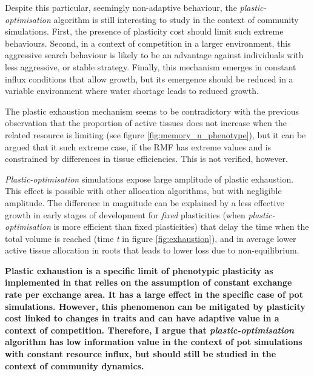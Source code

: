 Despite this particular, seemingly non-adaptive behaviour, the \textit{plastic-optimisation} algorithm is still interesting to study in the context of community simulations. First, the presence of plasticity cost should limit such extreme behaviours. Second, in a context of competition in a larger environment, this aggressive search behaviour is likely to be an advantage against individuals with less aggressive, or stable strategy. Finally, this mechanism emerges in constant influx conditions that allow growth, but its emergence should be reduced in a variable environment where water shortage leads to reduced growth.

The plastic exhaustion mechanism seems to be contradictory with the previous observation that the proportion of active tissues does not increase when the related resource is limiting (see figure \ref{fig:memory_n_phenotype}), but it can be argued that it such extreme case, if the RMF has extreme values and is constrained by differences in tissue efficiencies. This is not verified, however.

\textit{Plastic-optimisation} simulations expose large amplitude of plastic exhaustion. This effect is possible with other allocation algorithms, but with negligible amplitude. The difference in magnitude can be explained by a less effective growth in early stages of development for \textit{fixed} plasticities (when \textit{plastic-optimisation} is more efficient than fixed plasticities) that delay the time when the total volume is reached (time \textit{t} in figure \ref{fig:exhaustion}), and in average lower active tissue allocation in roots that leads to lower loss due to non-equilibrium.

\textbf{Plastic exhaustion is a specific limit of phenotypic plasticity as implemented in \model that relies on the assumption of constant exchange rate per exchange area. It has a large effect in the specific case of pot simulations. However, this phenomenon can be mitigated by plasticity cost linked to changes in traits and can have adaptive value in a context of competition. Therefore, I argue that \textit{plastic-optimisation} algorithm  has low information value in the context of pot simulations with constant resource influx, but should still be studied in the context of community dynamics.}

%
%

